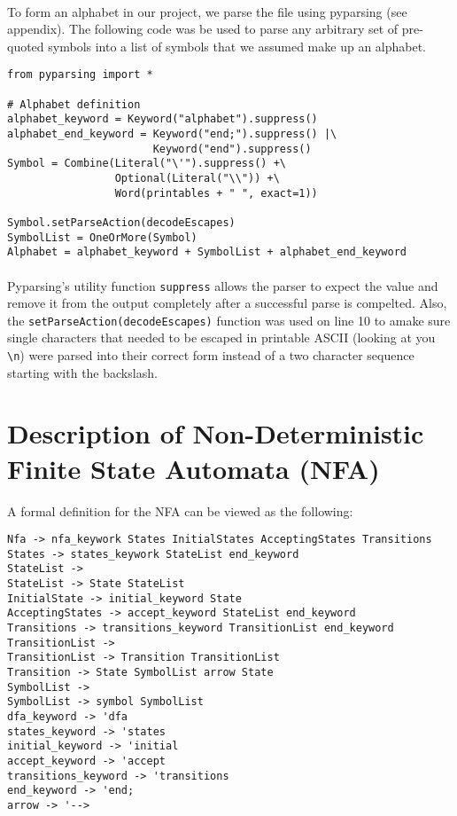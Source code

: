 \documentclass{article}
\begin{document}
\paragraph{}To form an alphabet in our project, we parse the file using pyparsing
(see appendix). The following code was be used to parse any arbitrary
set of pre-quoted symbols into a list of symbols that we assumed make up
an alphabet.

\begin{verbatim}
from pyparsing import *

# Alphabet definition
alphabet_keyword = Keyword("alphabet").suppress()
alphabet_end_keyword = Keyword("end;").suppress() |\
                       Keyword("end").suppress()
Symbol = Combine(Literal("\'").suppress() +\
                 Optional(Literal("\\")) +\ 
                 Word(printables + " ", exact=1))

Symbol.setParseAction(decodeEscapes)
SymbolList = OneOrMore(Symbol)
Alphabet = alphabet_keyword + SymbolList + alphabet_end_keyword
\end{verbatim}

\paragraph{} Pyparsing's utility function \verb|suppress| allows the 
parser to expect the value and remove it from the output completely
after a successful parse is compelted. Also, the
\verb|setParseAction(decodeEscapes)| function was used on line 10 to
amake sure single characters that needed to be escaped in printable
ASCII (looking at you \verb|\n|) were parsed into their correct form
instead of a two character sequence starting with the backslash.

\section{Description of Non-Deterministic Finite State Automata (NFA)}
\label{sec:nfa}
A formal definition for the NFA can be viewed as the following:
\begin{verbatim}
Nfa -> nfa_keywork States InitialStates AcceptingStates Transitions
States -> states_keywork StateList end_keyword
StateList -> 
StateList -> State StateList
InitialState -> initial_keyword State
AcceptingStates -> accept_keyword StateList end_keyword
Transitions -> transitions_keyword TransitionList end_keyword
TransitionList ->
TransitionList -> Transition TransitionList
Transition -> State SymbolList arrow State
SymbolList ->
SymbolList -> symbol SymbolList
dfa_keyword -> 'dfa
states_keyword -> 'states
initial_keyword -> 'initial
accept_keyword -> 'accept
transitions_keyword -> 'transitions
end_keyword -> 'end;
arrow -> '-->
\end{verbatim}
\end{document}
